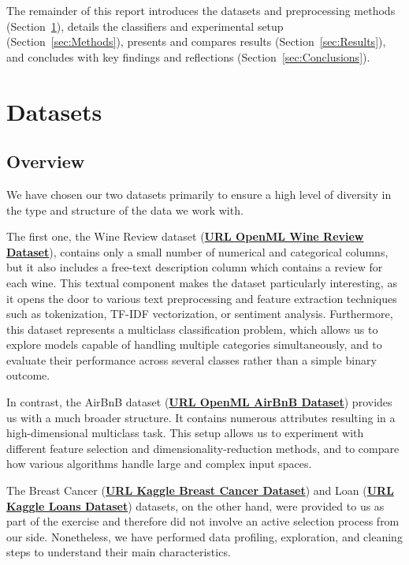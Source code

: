 \documentclass[12pt,a4paper]{article}
\begin{document}
The remainder of this report introduces the datasets and preprocessing methods (Section~\ref{sec:Datasets}), details the classifiers and experimental setup (Section~\ref{sec:Methods}), presents and compares results (Section~\ref{sec:Results}), and concludes with key findings and reflections (Section~\ref{sec:Conclusions}).

\vspace{1.0cm}

\section{Datasets}
\label{sec:Datasets}
\subsection{Overview}
We have chosen our two datasets primarily to ensure a high level of diversity in the type and structure of the data we work with. 

The first one, the Wine Review dataset (\href{https://www.openml.org/search?type=data&id=46653}{\textbf{URL OpenML Wine Review Dataset}}), contains only a small number of numerical and categorical columns, but it also includes a free-text description column which contains a review for each wine. This textual component makes the dataset particularly interesting, as it opens the door to various text preprocessing and feature extraction techniques such as tokenization, TF-IDF vectorization, or sentiment analysis. Furthermore, this dataset represents a multiclass classification problem, which allows us to explore models capable of handling multiple categories simultaneously, and to evaluate their performance across several classes rather than a simple binary outcome.

In contrast, the AirBnB dataset (\href{https://www.openml.org/search?type=data&id=46881}{\textbf{URL OpenML AirBnB Dataset}}) provides us with a much broader structure. It contains numerous attributes resulting in a high-dimensional multiclass task. This setup allows us to experiment with different feature selection and dimensionality-reduction methods, and to compare how various algorithms handle large and complex input spaces.

The Breast Cancer (\href{https://www.kaggle.com/competitions/184-702-tu-ml-2025w-breast-cancer/data}{\textbf{URL Kaggle Breast Cancer Dataset}}) and Loan (\href{https://www.kaggle.com/competitions/184-702-tu-ml-2025-w-loan/data}{\textbf{URL Kaggle Loans Dataset}}\url{}) datasets, on the other hand, were provided to us as part of the exercise and therefore did not involve an active selection process from our side. Nonetheless, we have performed data profiling, exploration, and cleaning steps to understand their main characteristics. 
\end{document}
